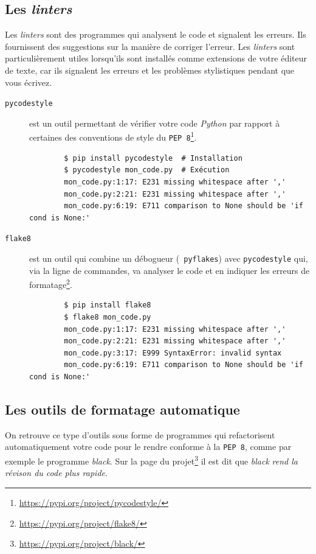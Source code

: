 \documentclass[a4paper,12pt]{book}
\begin{document}
\subsection*{Les \textit{linters}}
Les \textit{linters} sont des programmes qui analysent le code et signalent les erreurs. Ils fournissent des suggestions sur la manière de corriger l'erreur. Les \textit{linters} sont particulièrement utiles lorsqu'ils sont installés comme extensions de votre éditeur de texte, car ils signalent les erreurs et les problèmes stylistiques pendant que vous écrivez.
\medskip

\begin{description}
	\item[\texttt{pycodestyle}] est un outil permettant de vérifier votre code \textit{Python} par rapport à certaines des conventions de style du \texttt{PEP 8}\footnote{\url{https://pypi.org/project/pycodestyle/}}.
	\begin{verbatim}
	    $ pip install pycodestyle  # Installation
	    $ pycodestyle mon_code.py  # Exécution
	    mon_code.py:1:17: E231 missing whitespace after ','
	    mon_code.py:2:21: E231 missing whitespace after ','
	    mon_code.py:6:19: E711 comparison to None should be 'if cond is None:'
	\end{verbatim}
	\item[\texttt{flake8}] est un outil qui combine un débogueur (\texttt{ pyflakes}) avec \texttt{pycodestyle} qui, via la ligne de commandes, va analyser le code et en indiquer les erreurs de formatage\footnote{\url{https://pypi.org/project/flake8/}}.
	\begin{verbatim}
	    $ pip install flake8
	    $ flake8 mon_code.py
	    mon_code.py:1:17: E231 missing whitespace after ','
	    mon_code.py:2:21: E231 missing whitespace after ','
	    mon_code.py:3:17: E999 SyntaxError: invalid syntax
	    mon_code.py:6:19: E711 comparison to None should be 'if cond is None:'
	\end{verbatim}
\end{description}
\medskip

\subsection*{Les outils de formatage automatique}
On retrouve ce type d'outils sous forme de programmes qui refactorisent automatiquement votre code pour le rendre conforme à la \texttt{PEP 8}, comme par exemple le programme \textit{black}. Sur la page du projet\footnote{\url{https://pypi.org/project/black/}} il est dit que \textit{black} \og \textit{rend la révison du code plus rapide}\fg{}.
\medskip
\end{document}
